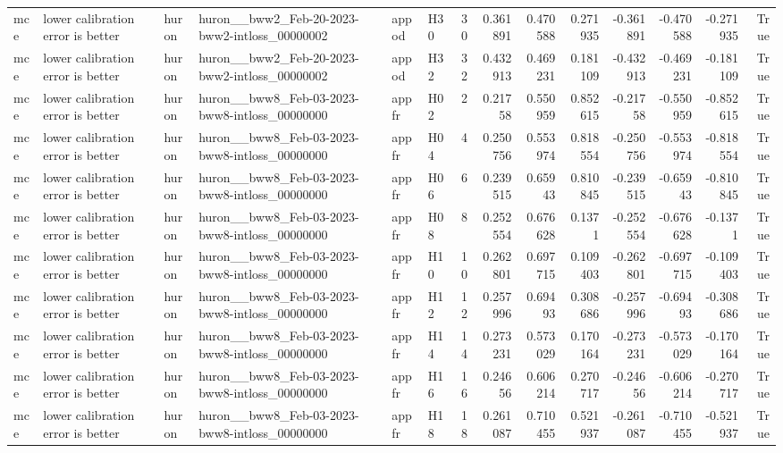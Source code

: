 \begin{longtable}{llllllrrrrrrrr}
mce & lower calibration error is better & huron & huron\_\_bww2\_Feb-20-2023-bww2-intloss\_00000002 & appod & H30 & 30 & 0.361891 & 0.470588 & 0.271935 & -0.361891 & -0.470588 & -0.271935 & True \\
mce & lower calibration error is better & huron & huron\_\_bww2\_Feb-20-2023-bww2-intloss\_00000002 & appod & H32 & 32 & 0.432913 & 0.469231 & 0.181109 & -0.432913 & -0.469231 & -0.181109 & True \\
mce & lower calibration error is better & huron & huron\_\_bww8\_Feb-03-2023-bww8-intloss\_00000000 & appfr & H02 & 2 & 0.21758 & 0.550959 & 0.852615 & -0.21758 & -0.550959 & -0.852615 & True \\
mce & lower calibration error is better & huron & huron\_\_bww8\_Feb-03-2023-bww8-intloss\_00000000 & appfr & H04 & 4 & 0.250756 & 0.553974 & 0.818554 & -0.250756 & -0.553974 & -0.818554 & True \\
mce & lower calibration error is better & huron & huron\_\_bww8\_Feb-03-2023-bww8-intloss\_00000000 & appfr & H06 & 6 & 0.239515 & 0.65943 & 0.810845 & -0.239515 & -0.65943 & -0.810845 & True \\
mce & lower calibration error is better & huron & huron\_\_bww8\_Feb-03-2023-bww8-intloss\_00000000 & appfr & H08 & 8 & 0.252554 & 0.676628 & 0.1371 & -0.252554 & -0.676628 & -0.1371 & True \\
mce & lower calibration error is better & huron & huron\_\_bww8\_Feb-03-2023-bww8-intloss\_00000000 & appfr & H10 & 10 & 0.262801 & 0.697715 & 0.109403 & -0.262801 & -0.697715 & -0.109403 & True \\
mce & lower calibration error is better & huron & huron\_\_bww8\_Feb-03-2023-bww8-intloss\_00000000 & appfr & H12 & 12 & 0.257996 & 0.69493 & 0.308686 & -0.257996 & -0.69493 & -0.308686 & True \\
mce & lower calibration error is better & huron & huron\_\_bww8\_Feb-03-2023-bww8-intloss\_00000000 & appfr & H14 & 14 & 0.273231 & 0.573029 & 0.170164 & -0.273231 & -0.573029 & -0.170164 & True \\
mce & lower calibration error is better & huron & huron\_\_bww8\_Feb-03-2023-bww8-intloss\_00000000 & appfr & H16 & 16 & 0.24656 & 0.606214 & 0.270717 & -0.24656 & -0.606214 & -0.270717 & True \\
mce & lower calibration error is better & huron & huron\_\_bww8\_Feb-03-2023-bww8-intloss\_00000000 & appfr & H18 & 18 & 0.261087 & 0.710455 & 0.521937 & -0.261087 & -0.710455 & -0.521937 & True \\

\end{longtable}
